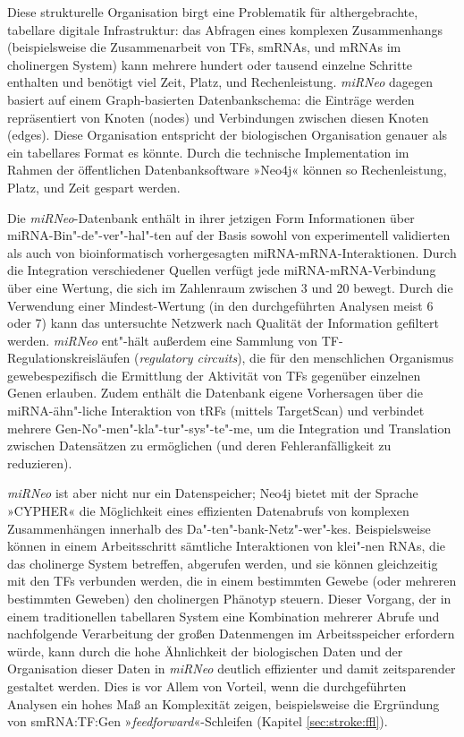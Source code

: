 Diese strukturelle Organisation birgt eine Problematik für althergebrachte, tabellare digitale Infrastruktur: das Abfragen eines komplexen Zusammenhangs (beispielsweise die Zusammenarbeit von TFs, smRNAs, und mRNAs im cholinergen System) kann mehrere hundert oder tausend einzelne Schritte enthalten und benötigt viel Zeit, Platz, und Rechenleistung. \emph{miRNeo} dagegen basiert auf einem Graph-basierten Datenbankschema: die Einträge werden repräsentiert von Knoten (nodes) und Verbindungen zwischen diesen Knoten (edges). Diese Organisation entspricht der biologischen Organisation genauer als ein tabellares Format es könnte. Durch die technische Implementation im Rahmen der öffentlichen Datenbanksoftware »Neo4j« können so Rechenleistung, Platz, und Zeit gespart werden.

Die \emph{miRNeo}-Datenbank enthält in ihrer jetzigen Form Informationen über miRNA-Bin"-de"-ver"-hal"-ten auf der Basis sowohl von experimentell validierten als auch von bioinformatisch vorhergesagten miRNA-mRNA-Interaktionen. Durch die Integration verschiedener Quellen verfügt jede miRNA-mRNA-Verbindung über eine Wertung, die sich im Zahlenraum zwischen 3 und 20 bewegt. Durch die Verwendung einer Mindest-Wertung (in den durchgeführten Analysen meist 6 oder 7) kann das untersuchte Netzwerk nach Qualität der Information gefiltert werden. \emph{miRNeo} ent"-hält außerdem eine Sammlung von TF-Regulationskreisläufen (\emph{regulatory circuits}), die für den menschlichen Organismus gewebespezifisch die Ermittlung der Aktivität von TFs gegenüber einzelnen Genen erlauben. Zudem enthält die Datenbank eigene Vorhersagen über die miRNA-ähn"-liche Interaktion von tRFs (mittels TargetScan) und verbindet mehrere Gen-No"-men"-kla"-tur"-sys"-te"-me, um die Integration und Translation zwischen Datensätzen zu ermöglichen (und deren Fehleranfälligkeit zu reduzieren).

\emph{miRNeo} ist aber nicht nur ein Datenspeicher; Neo4j bietet mit der Sprache »CYPHER« die Möglichkeit eines effizienten Datenabrufs von komplexen Zusammenhängen innerhalb des Da"-ten"-bank-Netz"-wer"-kes. Beispielsweise können in einem Arbeitsschritt sämtliche Interaktionen von klei"-nen RNAs, die das cholinerge System betreffen, abgerufen werden, und sie können gleichzeitig mit den TFs verbunden werden, die in einem bestimmten Gewebe (oder mehreren bestimmten Geweben) den cholinergen Phänotyp steuern. Dieser Vorgang, der in einem traditionellen tabellaren System eine Kombination mehrerer Abrufe und nachfolgende Verarbeitung der großen Datenmengen im Arbeitsspeicher erfordern würde, kann durch die hohe Ähnlichkeit der biologischen Daten und der Organisation dieser Daten in \emph{miRNeo} deutlich effizienter und damit zeitsparender gestaltet werden. Dies is vor Allem von Vorteil, wenn die durchgeführten Analysen ein hohes Maß an Komplexität zeigen, beispielsweise die Ergründung von smRNA:TF:Gen »\emph{feedforward}«-Schleifen (Kapitel \ref{sec:stroke:ffl}).

